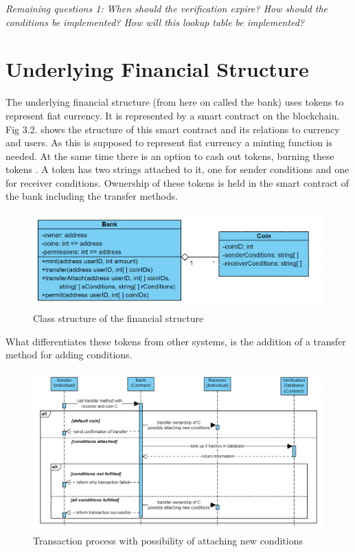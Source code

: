 \emph{Remaining questions 1: When should the verification expire? How should the conditions be implemented? How will this lookup table be implemented?}
\section{Underlying Financial Structure}
The underlying financial structure (from here on called the bank) uses tokens to represent fiat currency. It is represented by a smart contract on the blockchain. Fig 3.2. shows the structure of this smart contract and its relations to currency and users. As this is supposed to represent fiat currency a minting function is needed. At the same time there is an option to cash out tokens, burning these tokens \cite{pattern}. A token has two strings attached to it, one for sender conditions and one for receiver conditions. Ownership of these tokens is held in the smart contract of the bank including the transfer methods.\\
\begin{figure}[H]
    \centering
    \includegraphics[scale=0.55]{figures/finance_2.0.PNG}  
    \caption{Class structure of the financial structure}
    \label{fig:financeUML}
\end{figure}
What differentiates these tokens from other systems, is the addition of a transfer method for adding conditions.
\begin{figure}[H]
    \centering
    \includegraphics[scale=0.45]{figures/transfer.PNG}  
    \caption{Transaction process with possibility of attaching new conditions}
    \label{fig:transactionModel}
\end{figure}
